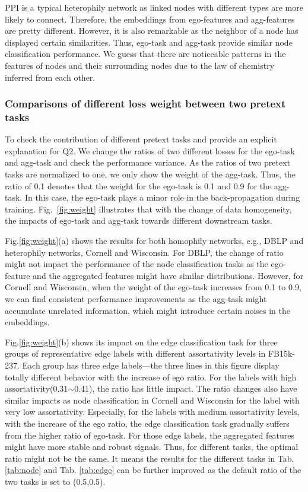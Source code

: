 \documentclass[10pt,journal,compsoc]{IEEEtran}
\begin{document}
PPI is a typical heterophily network as linked nodes with different types are more likely to connect. Therefore, the embeddings from ego-features and agg-features are pretty different. However, it is also remarkable as the neighbor of a node has displayed certain similarities. Thus, ego-task and agg-task provide similar node classification performance. We guess that there are noticeable patterns in the features of nodes and their surrounding nodes due to the law of chemistry inferred from each other.


\subsubsection {Comparisons of different loss weight between two pretext tasks}
To check the contribution of different pretext tasks and provide an explicit explanation for Q2. We change the ratios of two different losses for the ego-task and agg-task and check the performance variance. As the ratios of two pretext tasks are normalized to one, we only show the weight of the agg-task. Thus, the ratio of 0.1 denotes that the weight for the ego-task is 0.1 and 0.9 for the agg-task. In this case, the ego-task plays a minor role in the back-propagation during training.  Fig.~\ref{fig:weight} illustrates that with the change of data homogeneity, the impacts of ego-task and agg-task towards different downstream tasks. 


Fig.\ref{fig:weight}(a) shows the results for both homophily networks, e.g., DBLP and heterophily networks, Cornell and Wisconsin. For DBLP, the change of ratio might not impact the performance of the node classification tasks as the ego-feature and the aggregated features might have similar distributions. However, for Cornell and Wisconsin, when the weight of the ego-task increases from 0.1 to 0.9, we can find consistent performance improvements as the agg-task might accumulate unrelated information, which might introduce certain noises in the embeddings. 

Fig.\ref{fig:weight}(b) shows its impact on the edge classification task for three groups of representative edge labels with different assortativity levels in FB15k-237. Each group has three edge labels—the three lines in this figure display totally different behavior with the increase of ego ratio. For the labels with high assortativity(0.31$\sim$0.41), the ratio has little impact. The ratio changes also have similar impacts as node classification in Cornell and Wisconsin for the label with very low assortativity. Especially, for the labels with medium assortativity levels, with the increase of the ego ratio, the edge classification task gradually suffers from the higher ratio of ego-task. For those edge labels, the aggregated features might have more stable and robust signals. Thus, for different tasks, the optimal ratio might not be the same. It means the results for the different tasks in Tab. \ref{tab:node} and Tab. \ref{tab:edge} can be further improved as the default ratio of the two tasks is set to (0.5,0.5). 
\end{document}
